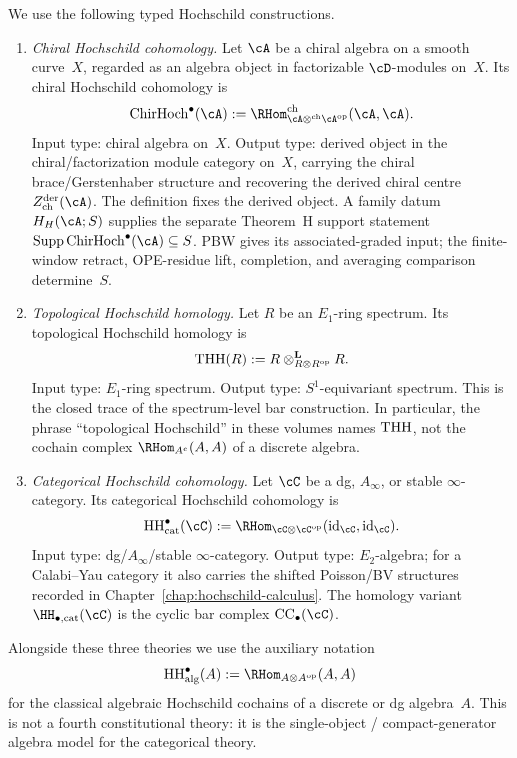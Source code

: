 \begin{proposition}
\label{prop:hochschild-crosswalk}
We use the following typed Hochschild constructions.
\begin{enumerate}[label=\textup{(\roman*)}]
\item \emph{Chiral Hochschild cohomology.}
 Let $\cA$ be a chiral algebra on a smooth curve~$X$, regarded as an
 algebra object in factorizable $\cD$-modules on~$X$. Its chiral
 Hochschild cohomology is
 \[
 \ChirHoch^\bullet(\cA)
 := \RHom^{\mathrm{ch}}_{\cA \otimes^{\mathrm{ch}} \cA^{\mathrm{op}}}
 (\cA,\cA).
 \]
 Input type: chiral algebra on~$X$.
 Output type: derived object in the chiral/factorization module
 category on~$X$, carrying the chiral brace/Gerstenhaber structure and
 recovering the derived chiral centre
 $Z^{\mathrm{der}}_{\mathrm{ch}}(\cA)$.
 The definition fixes the derived object.  A family datum
 $H_H(\cA;S)$ supplies the separate Theorem~H support statement
 $\operatorname{Supp}\ChirHoch^\bullet(\cA)\subseteq S$.
 PBW gives its associated-graded input; the finite-window retract,
 OPE-residue lift, completion, and averaging comparison determine~$S$.

\item \emph{Topological Hochschild homology.}
 Let $R$ be an $E_1$-ring spectrum. Its topological Hochschild
 homology is
 \[
 \mathrm{THH}(R)
 := R \otimes^{\mathbf L}_{R \otimes R^{\mathrm{op}}} R.
 \]
 Input type: $E_1$-ring spectrum.
 Output type: $S^1$-equivariant spectrum.
 This is the closed trace of the spectrum-level bar construction.
 In particular, the phrase ``topological Hochschild'' in these
 volumes names $\mathrm{THH}$, not the cochain complex
 $\RHom_{A^e}(A,A)$ of a discrete algebra.

\item \emph{Categorical Hochschild cohomology.}
 Let $\cC$ be a dg, $A_\infty$, or stable $\infty$-category. Its
 categorical Hochschild cohomology is
 \[
 \HHcat^\bullet(\cC)
 := \RHom_{\cC \otimes \cC^{\mathrm{op}}}(\id_{\cC}, \id_{\cC}).
 \]
 Input type: dg/$A_\infty$/stable $\infty$-category.
 Output type: $E_2$-algebra; for a Calabi--Yau category it also
 carries the shifted Poisson/BV structures recorded in
 Chapter~\textup{\ref{chap:hochschild-calculus}}.
 The homology variant $\HH_{\bullet,\mathrm{cat}}(\cC)$ is the cyclic
 bar complex $\mathrm{CC}_\bullet(\cC)$.
\end{enumerate}

\noindent
Alongside these three theories we use the auxiliary notation
\[
 \HHalg^\bullet(A)
 := \RHom_{A \otimes A^{\mathrm{op}}}(A,A)
\]
for the classical algebraic Hochschild cochains of a discrete or
dg algebra~$A$. This is not a fourth constitutional theory:
it is the single-object / compact-generator algebra model for the
categorical theory.


\end{proposition}
